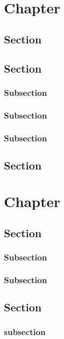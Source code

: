 \documentclass[a4paper,11pt,english]{report}
\begin{document}
\chapter{Chapter}
\section{Section}

\section{Section}

\subsection{Subsection}

\subsection{Subsection}

\subsection{Subsection}

\section{Section}

\chapter{Chapter}

\section{Section}
\subsection{Subsection}

\subsection{Subsection}

\section{Section}
\subsection{subsection}
\end{document}
